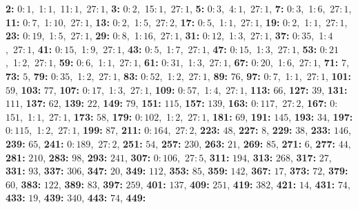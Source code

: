 \textsf{\bfseries 2:} 0:\,$1$,\ 1:\,$1$,\ 11:\,$1$,\ 27:\,$1$, \textsf{\bfseries 3:} 0:\,$2$,\ 15:\,$1$,\ 27:\,$1$, \textsf{\bfseries 5:} 0:\,$3$,\ 4:\,$1$,\ 27:\,$1$, \textsf{\bfseries 7:} 0:\,$3$,\ 1:\,$6$,\ 27:\,$1$, \textsf{\bfseries 11:} 0:\,$7$,\ 1:\,$10$,\ 27:\,$1$, \textsf{\bfseries 13:} 0:\,$2$,\ 1:\,$5$,\ 27:\,$2$, \textsf{\bfseries 17:} 0:\,$5$,\ 1:\,$1$,\ 27:\,$1$, \textsf{\bfseries 19:} 0:\,$2$,\ 1:\,$1$,\ 27:\,$1$, \textsf{\bfseries 23:} 0:\,$19$,\ 1:\,$5$,\ 27:\,$1$, \textsf{\bfseries 29:} 0:\,$8$,\ 1:\,$16$,\ 27:\,$1$, \textsf{\bfseries 31:} 0:\,$12$,\ 1:\,$3$,\ 27:\,$1$, \textsf{\bfseries 37:} 0:\,$35$,\ 1:\,$4$,\ 27:\,$1$, \textsf{\bfseries 41:} 0:\,$15$,\ 1:\,$9$,\ 27:\,$1$, \textsf{\bfseries 43:} 0:\,$5$,\ 1:\,$7$,\ 27:\,$1$, \textsf{\bfseries 47:} 0:\,$15$,\ 1:\,$3$,\ 27:\,$1$, \textsf{\bfseries 53:} 0:\,$21$,\ 1:\,$2$,\ 27:\,$1$, \textsf{\bfseries 59:} 0:\,$6$,\ 1:\,$1$,\ 27:\,$1$, \textsf{\bfseries 61:} 0:\,$31$,\ 1:\,$3$,\ 27:\,$1$, \textsf{\bfseries 67:} 0:\,$20$,\ 1:\,$6$,\ 27:\,$1$, \textsf{\bfseries 71:} $7$, \textsf{\bfseries 73:} $5$, \textsf{\bfseries 79:} 0:\,$35$,\ 1:\,$2$,\ 27:\,$1$, \textsf{\bfseries 83:} 0:\,$52$,\ 1:\,$2$,\ 27:\,$1$, \textsf{\bfseries 89:} $76$, \textsf{\bfseries 97:} 0:\,$7$,\ 1:\,$1$,\ 27:\,$1$, \textsf{\bfseries 101:} $59$, \textsf{\bfseries 103:} $77$, \textsf{\bfseries 107:} 0:\,$17$,\ 1:\,$3$,\ 27:\,$1$, \textsf{\bfseries 109:} 0:\,$57$,\ 1:\,$4$,\ 27:\,$1$, \textsf{\bfseries 113:} $66$, \textsf{\bfseries 127:} $39$, \textsf{\bfseries 131:} $111$, \textsf{\bfseries 137:} $62$, \textsf{\bfseries 139:} $22$, \textsf{\bfseries 149:} $79$, \textsf{\bfseries 151:} $115$, \textsf{\bfseries 157:} $139$, \textsf{\bfseries 163:} 0:\,$117$,\ 27:\,$2$, \textsf{\bfseries 167:} 0:\,$151$,\ 1:\,$1$,\ 27:\,$1$, \textsf{\bfseries 173:} $58$, \textsf{\bfseries 179:} 0:\,$102$,\ 1:\,$2$,\ 27:\,$1$, \textsf{\bfseries 181:} $69$, \textsf{\bfseries 191:} $145$, \textsf{\bfseries 193:} $34$, \textsf{\bfseries 197:} 0:\,$115$,\ 1:\,$2$,\ 27:\,$1$, \textsf{\bfseries 199:} $87$, \textsf{\bfseries 211:} 0:\,$164$,\ 27:\,$2$, \textsf{\bfseries 223:} $48$, \textsf{\bfseries 227:} $8$, \textsf{\bfseries 229:} $38$, \textsf{\bfseries 233:} $146$, \textsf{\bfseries 239:} $65$, \textsf{\bfseries 241:} 0:\,$189$,\ 27:\,$2$, \textsf{\bfseries 251:} $54$, \textsf{\bfseries 257:} $230$, \textsf{\bfseries 263:} $21$, \textsf{\bfseries 269:} $85$, \textsf{\bfseries 271:} $6$, \textsf{\bfseries 277:} $44$, \textsf{\bfseries 281:} $210$, \textsf{\bfseries 283:} $98$, \textsf{\bfseries 293:} $241$, \textsf{\bfseries 307:} 0:\,$106$,\ 27:\,$5$, \textsf{\bfseries 311:} $194$, \textsf{\bfseries 313:} $268$, \textsf{\bfseries 317:} $27$, \textsf{\bfseries 331:} $93$, \textsf{\bfseries 337:} $306$, \textsf{\bfseries 347:} $20$, \textsf{\bfseries 349:} $112$, \textsf{\bfseries 353:} $85$, \textsf{\bfseries 359:} $142$, \textsf{\bfseries 367:} $17$, \textsf{\bfseries 373:} $72$, \textsf{\bfseries 379:} $60$, \textsf{\bfseries 383:} $122$, \textsf{\bfseries 389:} $83$, \textsf{\bfseries 397:} $259$, \textsf{\bfseries 401:} $137$, \textsf{\bfseries 409:} $251$, \textsf{\bfseries 419:} $382$, \textsf{\bfseries 421:} $14$, \textsf{\bfseries 431:} $74$, \textsf{\bfseries 433:} $19$, \textsf{\bfseries 439:} $340$, \textsf{\bfseries 443:} $74$, \textsf{\bfseries 449:} 